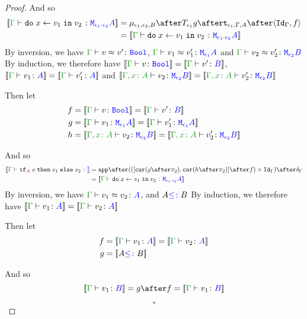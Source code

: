 \documentclass{report}
\begin{document}
\begin{framed}
\begin{proof}
        
        
        And so
        \begin{equation}
            \begin{split}
                \deno{\gtyperelation{\doin{x}{v_1}{v_2}}{\M{\e_1\dot\e_2}{A}}} & = \bind{\e_1}{\e_2}{B} \after \T{\e_1}{g} \after \tstrength{\e_1}{\G}{A} \after \pr{\idg}{f}\\
                 & = \deno{\gtyperelation{\doin{x}{v_1}{v_2}}{\M{\e_1\dot\e_2}{A}}}
            \end{split}
        \end{equation}
        \case{\eqif}
        By inversion, we have $\gberelation{v}{v'}{\B}$, $\gberelation{v_1}{v_1'}{\M{\e_1}{A}}$ and $\gberelation{v_2}{v_2'}{\M{\e_2}{B}}$
        By induction, we therefore have $\deno{\gtyperelation{v}{\B}} = \deno{\gtyperelation{v'}{B}}$, $\deno{\gtyperelation{v_1}{ A}}= \deno{\gtyperelation{v_1'}{ A}}$ and $\deno{\typerelation{\gax}{v_2}{\M{\e_2}{B}}} = \deno{\typerelation{\gax}{v_2'}{\M{\e_2}{B}}}$
        
        Then let
        \begin{align*}
            f &{}=\deno{\gtyperelation{v}{\B}} = \deno{\gtyperelation{v'}{B}}\\
            g &{}=\deno{\gtyperelation{v_1}{\M{\e_1}{A}}}= \deno{\gtyperelation{v_1'}{\M{\e_1}{A}}}\\
            h &{}=\deno{\typerelation{\gax}{v_2}{\M{\e_2}{B}}} = \deno{\typerelation{\gax}{v_2'}{\M{\e_2}{B}}}
        \end{align*}
        
        
        
        And so
        \begin{equation}
            \begin{split}
                \deno{\gtyperelation{\pifthenelse{A}{v}{v_1}{v_2}}} & = \ifMorph{f}{g}{h}\\
                 & = \deno{\gtyperelation{\doin{x}{v_1}{v_2}}{\M{\e_1\dot\e_2}{A}}}
            \end{split}
        \end{equation}
        \case{\eqsubtype}
        By inversion, we have $\gberelation{v_1}{v_2}{A}$, and $A {\color{blue} \leq\colon} B$ 
        By induction, we therefore have $\deno{\gtyperelation{v_1}{A}} = \deno{\gtyperelation{v_2}{A}}$
        
        Then let
        \begin{align*}
            f &{}=\deno{\gtyperelation{v_1}{A}} = \deno{\gtyperelation{v_2}{A}}\\
            g &{}=\deno{A \subtype B}
        \end{align*}
        
        
        
        And so
        \begin{equation}
                \deno{\gtyperelation{v_1}{B}} = g \after f = \deno{\gtyperelation{v_1}{B}}
        \end{equation}
        
        $$\square$$
    \end{proof}
\end{framed}
\end{document}
